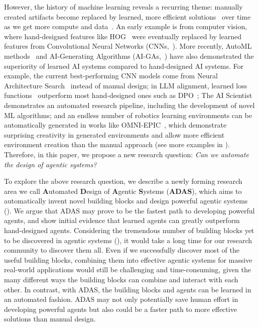 \documentclass{article}
\newcommand{\problem}{ADAS\xspace}
\begin{document}
However, the history of machine learning reveals a recurring theme: manually created artifacts become replaced by learned, more efficient solutions~\citep{clune2019aigas} over time as we get more compute and data~\citep{sutton2019bitter}.
An early example is from computer vision, where hand-designed features like HOG~\citep{Dalal2005hog} were eventually replaced by learned features from Convolutional Neural Networks (CNNs,~\citet{krizhevsky2012alexnet}).
More recently, AutoML methods~\citep{hutter2019automl} and AI-Generating Algorithms (AI-GAs,~\citet{clune2019aigas}) have also demonstrated the superiority of learned AI systems compared to hand-designed AI systems.
For example, the current best-performing CNN models come from Neural Architecture Search~\citep{elsken2019neural,shen2023deepmad} instead of manual design; in LLM alignment, learned loss functions~\citep{lu2024discopop} outperform most hand-designed ones such as DPO~\citep{rafailov2024dpo}; The AI Scientist~\citep{lu2024aiscientist} demonstrates an automated research pipeline, including the development of novel ML algorithms; and an endless number of robotics learning environments can be automatically generated in works like OMNI-EPIC~\citep{faldor2024omni}, which demonstrate surprising creativity in generated environments and allow more efficient environment creation than the manual approach (see more examples in ).
Therefore, in this paper, we propose a new research question: \emph{Can we automate the design of agentic systems?}

To explore the above research question, we describe a newly forming research area we call \textbf{A}utomated \textbf{D}esign of \textbf{A}gentic \textbf{S}ystems (\textbf{\problem}), which aims to automatically invent novel building blocks and design powerful agentic systems ().
We argue that \problem may prove to be the fastest path to developing powerful agents, and show initial evidence that learned agents can greatly outperform hand-designed agents.
Considering the tremendous number of building blocks yet to be discovered in agentic systems (), it would take a long time for our research community to discover them all.
Even if we successfully discover most of the useful building blocks, combining them into effective agentic systems for massive real-world applications would still be challenging and time-consuming, given the many different ways the building blocks can combine and interact with each other.
In contrast, with \problem, the building blocks and agents can be learned in an automated fashion.
\problem may not only potentially save human effort in developing powerful agents but also could be a faster path to more effective solutions than manual design.
\end{document}
